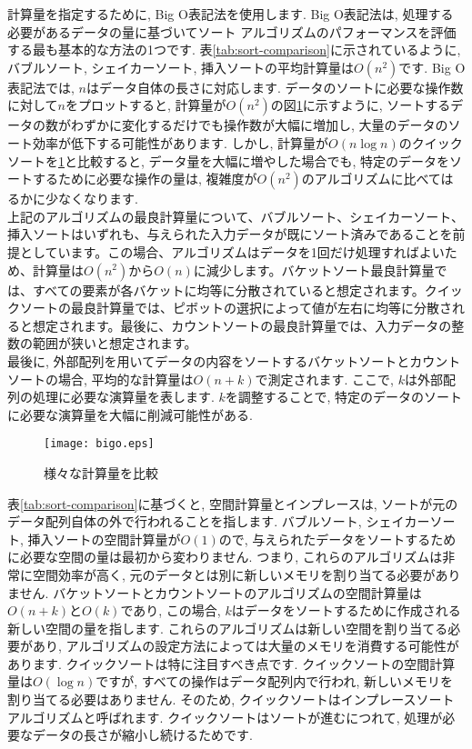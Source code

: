 \documentclass[a4j, 12pt]{jarticle}
\begin{document}
計算量を指定するために, Big O表記法を使用します. Big O表記法は, 処理する必要があるデータの量に基づいてソート アルゴリズムのパフォーマンスを評価する最も基本的な方法の1つです. 表\ref{tab:sort-comparison}に示されているように, バブルソート, シェイカーソート, 挿入ソートの平均計算量は$O(n^2)$です. Big O表記法では, $n$はデータ自体の長さに対応します. データのソートに必要な操作数に対して$n$をプロットすると, 計算量が$O(n^2)$の図\ref{bigograph}に示すように, ソートするデータの数がわずかに変化するだけでも操作数が大幅に増加し, 大量のデータのソート効率が低下する可能性があります. しかし, 計算量が$O(n \log n)$のクイックソートを\ref{bigograph}と比較すると, データ量を大幅に増やした場合でも, 特定のデータをソートするために必要な操作の量は, 複雑度が$O(n^2)$のアルゴリズムに比べてはるかに少なくなります.\\

上記のアルゴリズムの最良計算量について、バブルソート、シェイカーソート、挿入ソートはいずれも、与えられた入力データが既にソート済みであることを前提としています。この場合、アルゴリズムはデータを1回だけ処理すればよいため、計算量は$O(n^2)$から$O(n)$に減少します。バケットソート最良計算量では、すべての要素が各バケットに均等に分散されていると想定されます。クイックソートの最良計算量では、ピボットの選択によって値が左右に均等に分散されると想定されます。最後に、カウントソートの最良計算量では、入力データの整数の範囲が狭いと想定されます。\\

最後に, 外部配列を用いてデータの内容をソートするバケットソートとカウントソートの場合, 平均的な計算量は$O(n + k)$で測定されます. ここで, $k$は外部配列の処理に必要な演算量を表します. $k$を調整することで, 特定のデータのソートに必要な演算量を大幅に削減可能性がある.\\

\begin{figure}[H]
  \centering
  \texttt{[image: bigo.eps]}
  \caption{様々な計算量を比較}\label{bigograph}
\end{figure}

表\ref{tab:sort-comparison}に基づくと, 空間計算量とインプレースは, ソートが元のデータ配列自体の外で行われることを指します. バブルソート, シェイカーソート, 挿入ソートの空間計算量が$O(1)$ので, 与えられたデータをソートするために必要な空間の量は最初から変わりません. つまり, これらのアルゴリズムは非常に空間効率が高く, 元のデータとは別に新しいメモリを割り当てる必要がありません. バケットソートとカウントソートのアルゴリズムの空間計算量は$O(n + k)$と$O(k)$であり, この場合, $k$はデータをソートするために作成される新しい空間の量を指します. これらのアルゴリズムは新しい空間を割り当てる必要があり, アルゴリズムの設定方法によっては大量のメモリを消費する可能性があります. クイックソートは特に注目すべき点です. クイックソートの空間計算量は$O(\log n)$ですが, すべての操作はデータ配列内で行われ, 新しいメモリを割り当てる必要はありません. そのため, クイックソートはインプレースソートアルゴリズムと呼ばれます. クイックソートはソートが進むにつれて, 処理が必要なデータの長さが縮小し続けるためです.\\
\end{document}
